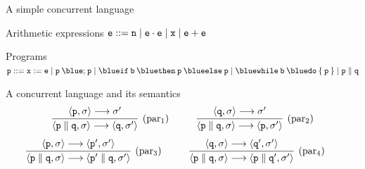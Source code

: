 \documentclass{beamer}
\begin{document}
\begin{frame}{A simple concurrent language}

        \vspace{0.7cm}
	\begin{block}{Arithmetic expressions}
        $\mathtt{e} ::=  \mathtt{n}  \mid \mathtt{e \cdot e}
        \mid  \mathtt{x}  \mid \mathtt{e + e}$
	\end{block}

	\vspace{0.7cm}
	\begin{block}{Programs}
        $\prog{p} ::= \mathtt{x} := \mathtt{e} \mid
	\mathtt{p \> {\blue ;} \> p} \mid
	\mathtt{{\blue if} \> b \> {\blue then} \> p \> {\blue else} \> p} \mid
	\mathtt{{\blue while} \> b \> {\blue do} \> \{ \> p \> \}}
        \mid \prog{p}\parallel \prog{q}$
	\end{block}

\end{frame}

\begin{frame}{A concurrent language and its semantics}
        \[
                \infer[(\text{par$_1$})]{
                        \langle \mathtt{p \parallel  q}, \sigma \rangle \longrightarrow 
                        \pv{\prog{q}}{\sigma'}
                }{
                        \langle \mathtt{p}, \sigma \rangle \longrightarrow \sigma'
                }
                \hspace{1cm}
                \infer[(\text{par$_2$})]{
                        \langle \mathtt{p  \parallel  q}, \sigma \rangle \longrightarrow 
                        \pv{\prog{p}}{\sigma'}
                }{
                        \langle \mathtt{q}, \sigma \rangle \longrightarrow \sigma'
                }
        \]
        \vspace{0.001cm}
        \[
                \hspace{-0.5cm}
                \infer[(\text{par$_3$})]{
                        \langle \mathtt{p \parallel q}, \sigma \rangle \longrightarrow 
                        \pv{\prog{p' \parallel q}}{\sigma'}
                }{
                        \langle \mathtt{p}, \sigma \rangle 
                        \longrightarrow \pv{\prog{p'}}{\sigma'}
                }
                \hspace{1cm}
                \infer[(\text{par$_4$})]{
                        \langle \mathtt{p \parallel q}, \sigma \rangle \longrightarrow 
                        \pv{\prog{p \parallel q'}}{\sigma'}
                }{
                        \langle \mathtt{q}, \sigma \rangle 
                        \longrightarrow \pv{\prog{q'}}{\sigma'}
                }
        \]
\end{frame}
\end{document}
